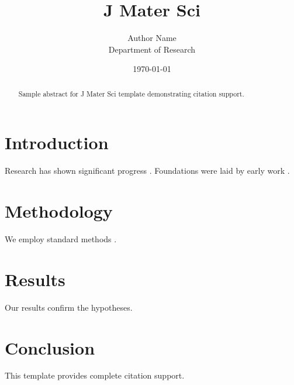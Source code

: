\documentclass{llncs}
\title{J Mater Sci}
\author{Author Name \\ \small Department of Research}
\date{\today}
\begin{document}
\maketitle

\begin{abstract}
Sample abstract for J Mater Sci template demonstrating citation support.
\end{abstract}

\section{Introduction}
Research has shown significant progress \citep{einstein1905}. Foundations were laid by early work \citep{turing1950}.

\section{Methodology}
We employ standard methods \citep{knuth1984}.

\section{Results}
Our results confirm the hypotheses.

\section{Conclusion}
This template provides complete citation support.



\end{document}
